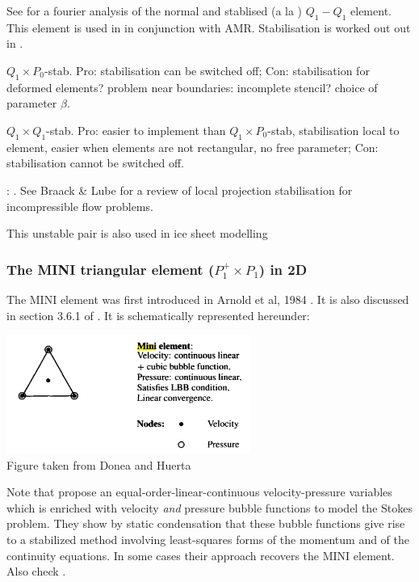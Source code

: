 See \cite{nosi01} for a fourier analysis of the normal and stablised (a la \cite{hufb86}) $Q_1-Q_1$ element.
This element is used in \cite{bugs09,busa13} in conjunction with AMR. 
Stabilisation is worked out out in \cite{dobo04,bodg06,bodo06}.

$Q_1\times P_0$-stab. Pro: stabilisation can be switched off; Con: stabilisation for deformed elements? 
problem near boundaries: incomplete stencil? choice of parameter $\beta$.

$Q_1\times Q_1$-stab. Pro: easier to implement than $Q_1\times P_0$-stab, stabilisation local to element, easier when elements are not rectangular, no free parameter; Con: stabilisation cannot be switched off.

\Literature: \cite{shry78,temr92,tezd92,grcc95,idsn95,knto00,fros07,lihc09}. See Braack \& Lube \cite{brlu09}
for a review of local projection stabilisation for incompressible flow problems. 

This unstable pair is also used in ice sheet modelling \cite{heah18,zhjg11,zwgg07}

\subsubsection{The MINI triangular element ($P_1^+\times P_1$) in 2D}
\label{pair:mini}

The  MINI element was first introduced in Arnold et al, 1984 \cite{arbf84}.
It is also discussed in section 3.6.1 of \cite{john16}.
It is schematically represented hereunder:

\begin{center}
\includegraphics[width=8cm]{images/mini/minielement}\\
{\captionfont Figure taken from Donea and Huerta \cite{dohu03}}
\end{center}

\begin{remark}
Note that \cite{frol03} propose an equal-order-linear-continuous velocity-pressure variables which is enriched 
with velocity {\it and} pressure bubble functions to model the Stokes problem. They show by static condensation that
these bubble functions give rise to a stabilized method involving least-squares forms of the momentum and of the
continuity equations. In some cases their approach recovers the MINI element. Also check \cite{gamt08}.
\end{remark}

